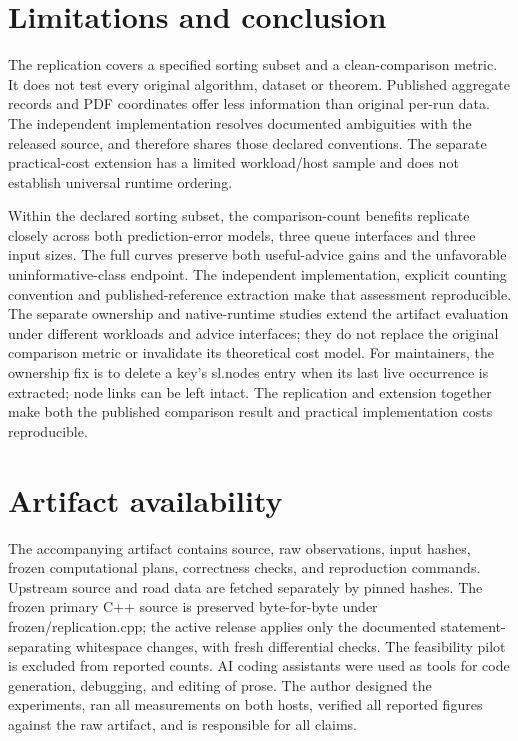\section{Limitations and conclusion}
The replication covers a specified sorting subset and a clean-comparison metric. It does not test every original algorithm, dataset or theorem. Published aggregate records and PDF coordinates offer less information than original per-run data. The independent implementation resolves documented ambiguities with the released source, and therefore shares those declared conventions. The separate practical-cost extension has a limited workload/host sample and does not establish universal runtime ordering.

Within the declared sorting subset, the comparison-count benefits replicate closely across both prediction-error models, three queue interfaces and three input sizes. The full curves preserve both useful-advice gains and the unfavorable uninformative-class endpoint. The independent implementation, explicit counting convention and published-reference extraction make that assessment reproducible. The separate ownership and native-runtime studies extend the artifact evaluation under different workloads and advice interfaces; they do not replace the original comparison metric or invalidate its theoretical cost model. For maintainers, the ownership fix is to delete a key's sl.nodes entry when its last live occurrence is extracted; node links can be left intact. The replication and extension together make both the published comparison result and practical implementation costs reproducible.

\section*{Artifact availability}
The accompanying artifact contains source, raw observations, input hashes, frozen computational plans, correctness checks, and reproduction commands. Upstream source and road data are fetched separately by pinned hashes. The frozen primary C++ source is preserved byte-for-byte under frozen/replication.cpp; the active release applies only the documented statement-separating whitespace changes, with fresh differential checks. The feasibility pilot is excluded from reported counts. AI coding assistants were used as tools for code generation, debugging, and editing of prose. The author designed the experiments, ran all measurements on both hosts, verified all reported figures against the raw artifact, and is responsible for all claims.

